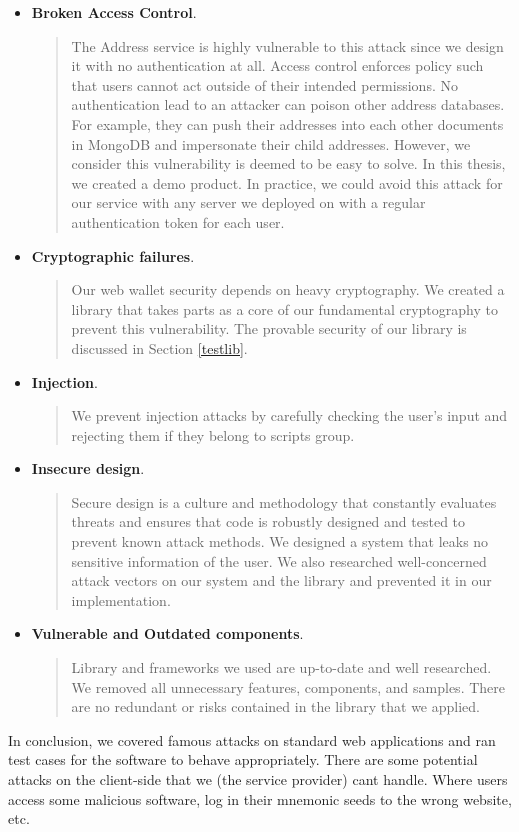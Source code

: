 \begin{itemize}
    \item \textbf{Broken Access Control}.
    \begin{quote}
        The Address service is highly vulnerable to this attack since we design it with no authentication at all. Access control enforces policy such that users cannot act outside of their intended permissions. No authentication lead to an attacker can poison other address databases. For example, they can push their addresses into each other documents in MongoDB and impersonate their child addresses. However, we consider this vulnerability is deemed to be easy to solve. In this thesis, we created a demo product. In practice, we could avoid this attack for our service with any server we deployed on with a regular authentication token for each user.
    \end{quote}
    \item \textbf{Cryptographic failures}.
    \begin{quote}
        Our web wallet security depends on heavy cryptography. We created a library that takes parts as a core of our fundamental cryptography to prevent this vulnerability. The provable security of our library is discussed in Section \ref{testlib}.
    \end{quote}
    \item \textbf{Injection}.
    \begin{quote}
        We prevent injection attacks by carefully checking the user’s input and rejecting them if they belong to scripts group.
    \end{quote}
    \item \textbf{Insecure design}.
    \begin{quote}
        Secure design is a culture and methodology that constantly evaluates threats and ensures that code is robustly designed and tested to prevent known attack methods. We designed a system that leaks no sensitive information of the user. We also researched well-concerned attack vectors on our system and the library and prevented it in our implementation.    \end{quote}
    \item \textbf{Vulnerable and Outdated components}.
    \begin{quote}
        Library and frameworks we used are up-to-date and well researched. We removed all unnecessary features, components, and samples. There are no redundant or risks contained in the library that we applied.
    \end{quote}
\end{itemize}
In conclusion, we covered famous attacks on standard web applications and ran test cases for the software to behave appropriately. There are some potential attacks on the client-side that we (the service provider) cant handle. Where users access some malicious software, log in their mnemonic seeds to the wrong website, etc.

